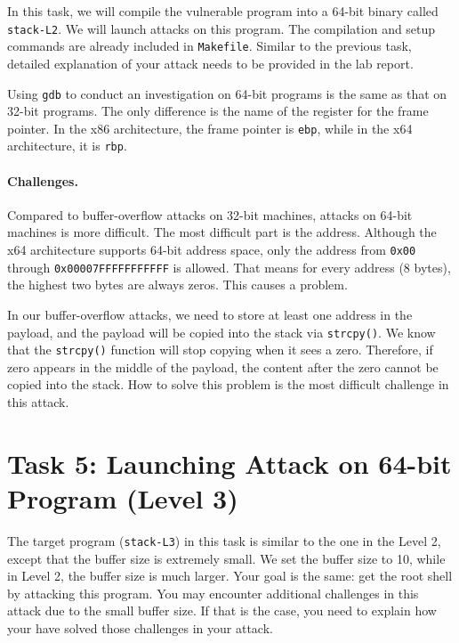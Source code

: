 In this task, we will compile the vulnerable program 
into a 64-bit binary called \texttt{stack-L2}.  
We will launch attacks on this program. The compilation and setup
commands are already included in \texttt{Makefile}. Similar to
the previous task, detailed explanation of your attack needs to be provided 
in the lab report. 


Using \texttt{gdb} to conduct an investigation on 64-bit programs 
is the same as that on 32-bit programs.
The only difference is the name of the register for the frame pointer.
In the x86 architecture,
the frame pointer is \texttt{ebp}, while in the x64 architecture,
it is \texttt{rbp}. 


\paragraph{Challenges.} Compared to buffer-overflow attacks on 32-bit
machines, attacks on 64-bit machines is more difficult. The most
difficult part is the address. Although the x64 architecture
supports 64-bit address space, only the address from
\texttt{0x00} through \texttt{0x00007FFFFFFFFFFF} is allowed. That means for
every address (8 bytes), the highest two bytes are always zeros.
This causes a problem.

In our buffer-overflow attacks, we need to store at least one address
in the payload, and the payload will be copied into the stack via
\texttt{strcpy()}. We know that the \texttt{strcpy()} function
will stop copying when it sees a zero. Therefore, if zero
appears in the middle of the payload, the content after the
zero cannot be copied into the stack. How to solve this
problem is the most difficult challenge in this attack.




\section{Task 5: Launching Attack on 64-bit Program (Level 3)}


The target program (\texttt{stack-L3}) in this task is similar to the one in the Level 2,
except that the buffer size is extremely small. We set the 
buffer size to 10, while in Level 2, the buffer size is much larger. 
Your goal is the same: get the root shell by attacking this \setuid program. 
You may encounter additional challenges in this attack 
due to the small buffer size. 
If that is the case, you need to explain how your have solved 
those challenges in your attack. 



